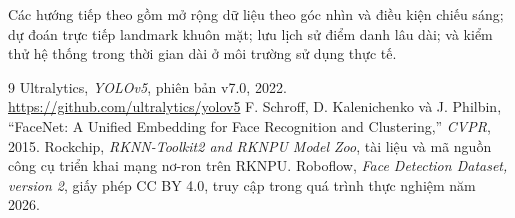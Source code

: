\documentclass[11pt,a4paper]{article}
\begin{document}
Các hướng tiếp theo gồm mở rộng dữ liệu theo góc nhìn và điều kiện chiếu sáng; dự đoán trực tiếp landmark khuôn mặt; lưu lịch sử điểm danh lâu dài; và kiểm thử hệ thống trong thời gian dài ở môi trường sử dụng thực tế.

\begin{thebibliography}{9}
 Ultralytics, \emph{YOLOv5}, phiên bản v7.0, 2022. \url{https://github.com/ultralytics/yolov5}
 F. Schroff, D. Kalenichenko và J. Philbin, ``FaceNet: A Unified Embedding for Face Recognition and Clustering,'' \emph{CVPR}, 2015.
 Rockchip, \emph{RKNN-Toolkit2 and RKNPU Model Zoo}, tài liệu và mã nguồn công cụ triển khai mạng nơ-ron trên RKNPU.
 Roboflow, \emph{Face Detection Dataset, version 2}, giấy phép CC BY 4.0, truy cập trong quá trình thực nghiệm năm 2026.
\end{thebibliography}
\end{document}
